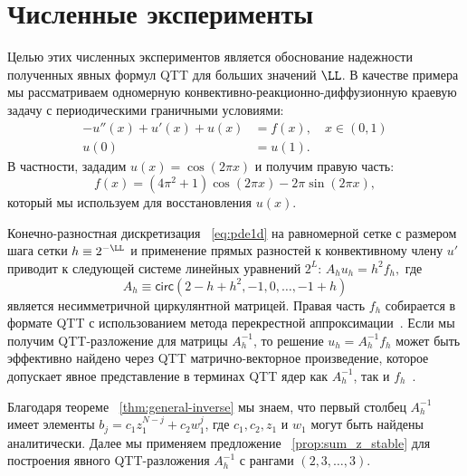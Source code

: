 \section{ Численные эксперименты} \label{sec:num_exp}

Целью этих численных экспериментов является обоснование надежности полученных явных формул QTT для больших значений $\LL$.
В качестве примера мы рассматриваем одномерную конвективно-реакционно-диффузионную краевую задачу с периодическими граничными условиями:
\begin{equation}\label{eq:pde1d}
\begin{aligned}
-u''(x) + u'(x) + u(x) &= f(x),\quad x\in (0,1) \\
u(0) &= u(1).
\end{aligned}
\end{equation}
В частности, зададим $u(x) = \cos (2\pi x)$ и получим правую часть: \[f(x) = (4\pi^2+1) \cos (2\pi x) - 2\pi \sin (2\pi x),\]
который мы используем для восстановления $u(x)$.

Конечно-разностная дискретизация ~\eqref{eq:pde1d} на равномерной сетке с размером шага сетки $h \equiv 2^{-\LL}$ и применение прямых разностей к конвективному члену $u'$ приводит к следующей системе линейных уравнений $2^L$:
$
A_h u_h = h^2 f_h,
$
где
\[
A_h \equiv \mathsf{circ}(2-h+h^2, -1, 0, \dots, -1+h)
\]
является несимметричной циркулянтной матрицей.
Правая часть $f_h$ собирается в формате QTT с использованием метода перекрестной аппроксимации~\cite{ot-ttcross-2010}.
Если мы получим QTT-разложение для матрицы $A_h^{-1}$, то решение $u_h = A_h^{-1} f_h$ может быть эффективно найдено через QTT матрично-векторное произведение, которое допускает явное представление в терминах QTT ядер как $A_h^{-1}$, так и $f_h$~\cite{osel-tt-2011}.

Благодаря теореме ~\ref{thm:general-inverse} мы знаем, что первый столбец $A_h^{-1}$ имеет элементы $b_j = c_1z_1^{N-j} + c_2w_1^{j}$, где $c_1, c_2, z_1$ и $w_1$ могут быть найдены аналитически.
Далее мы применяем предложение ~\ref{prop:sum_z_stable} для построения явного QTT-разложения $A_h^{-1}$ с рангами $(2,3,\dots,3)$.


